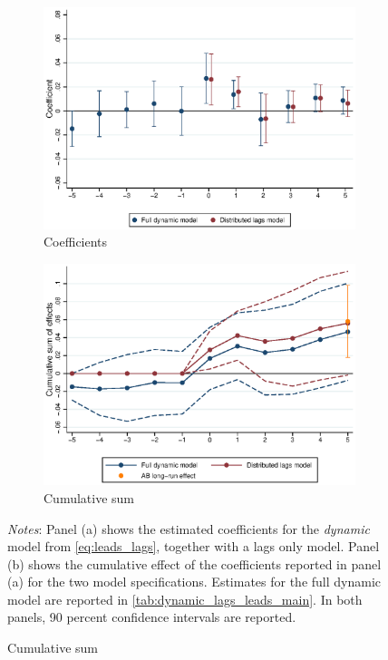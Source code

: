 \documentclass{article}
\begin{document}
\clearpage
\begin{figure}[htb!]
	\caption{The dynamic effects of MW increases on rents}
	\label{fig:fd_models_main}
	\centering
	\begin{subfigure}[b]{0.8\textwidth}
		\caption{Coefficients}
		\label{fig:dynamic_model_coeffs}
		\includegraphics[width = \textwidth]
		{../../analysis/first_differences/output/fd_models_coeffs_w5.eps}
	\end{subfigure}
	\begin{subfigure}[b]{0.8\textwidth}
		\caption{Cumulative sum}
		\label{fig:dynamic_model_cumsum}
		\includegraphics[width = \textwidth]
		{../../analysis/first_differences/output/fd_models_cumsum.eps}
	\end{subfigure}
	\begin{minipage}{0.95\textwidth} \footnotesize
		\vspace{2mm} 
		\textit{Notes}: Panel (a) shows the estimated coefficients for the \textit{dynamic} model from 
		\autoref{eq:leads_lags}, together with a lags only model. Panel (b) shows the cumulative 
		effect of the coefficients reported in panel (a) for the two model specifications. Estimates
		for the full dynamic model are reported in \autoref{tab:dynamic_lags_leads_main}. In both panels, 
		90 percent confidence intervals are reported. 
	\end{minipage}
\end{figure}
\end{document}
